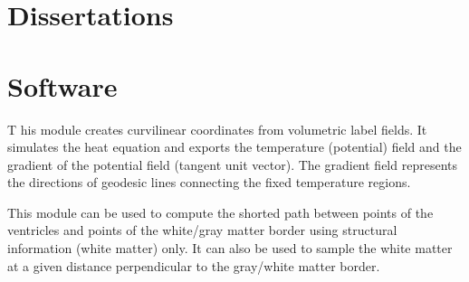 \documentclass[11pt,fleqn]{book} %
\begin{document}
%
%




\chapter{Dissertations}
\newpage



%	

\chapter{Software}
\newpage


\begin{multicols}{3}
    [
        \subtitle{Curvilinear coordinates in human white matter}
    ]
    \noindent \lettrine[lines=4]{\color{Black}T}{} his module creates curvilinear coordinates from volumetric label fields. 
    It simulates the heat equation and exports the temperature (potential) field and the 
    gradient of the potential field (tangent unit vector). The gradient field represents the 
    directions of geodesic lines connecting the fixed temperature regions.

    This module can be used to compute the shorted path between points of the ventricles 
    and points of the white/gray matter border using structural information (white matter) 
    only. It can also be used to sample the white matter at a given distance perpendicular to 
    the gray/white matter border.
        
\end{multicols}
    
\end{document}

